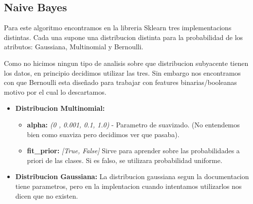 \subsection{Naive Bayes}

Para este algoritmo encontramos en la libreria Sklearn tres implementacions distintas. Cada una supone una distribucion distinta para la probabilidad de los atributos: Gaussiana, Multinomial y Bernoulli.


Como no hicimos ningun tipo de analisis sobre que distribucion subyacente tienen los datos, en principio decidimos utilizar las tres. Sin embargo nos encontramos con que Bernoulli esta diseñado para trabajar con features binarias/booleanas motivo por el cual lo descartamos.


\begin{itemize}
\item \textbf{Distribucion Multinomial:} 
	\begin{itemize}
	\item \textbf{alpha:} \textit{(0 , 0.001, 0.1, 1.0)} - Parametro de suavizado. (No entendemos bien como suaviza pero decidimos ver que pasaba).
	\item \textbf{fit\_prior:} \textit{[True, False]} Sirve para aprender sobre las probabilidades a priori de las clases. Si es falso, se utilizara probabilidad uniforme.
	\end{itemize}


\item \textbf{Distribucion Gaussiana:} La distribucion gaussiana segun la documentacion tiene parametros, pero en la implentacion cuando intentamos utilizarlos nos dicen que no existen.

\end{itemize}





